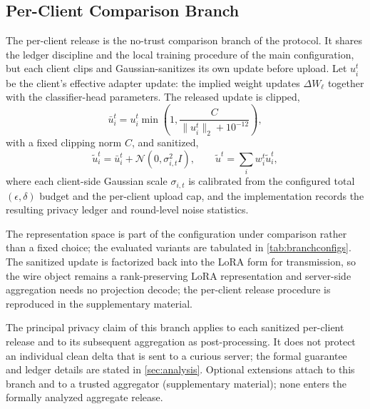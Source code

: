 \documentclass[a4paper,fleqn]{cas-dc}
\begin{document}
\subsection{Per-Client Comparison Branch}
\label{subsec:perclient}
\par
The per-client release is the no-trust comparison branch of the protocol. It shares the ledger discipline and the local training procedure of the main configuration, but each client clips and Gaussian-sanitizes its own update before upload. Let $u_i^t$ be the client's effective adapter update: the implied weight updates $\Delta W_\ell$ together with the classifier-head parameters. The released update is clipped,
\begin{equation}
\bar u_i^t=u_i^t\min\left(1,\frac{C}{\|u_i^t\|_2+10^{-12}}\right),
\end{equation}
with a fixed clipping norm $C$, and sanitized,
\begin{equation}
\widetilde u_i^t=\bar u_i^t+\mathcal{N}(0,\sigma_{i,t}^2 I),\qquad
\widetilde u^t=\sum_i w_i^t\widetilde u_i^t,
\end{equation}
where each client-side Gaussian scale $\sigma_{i,t}$ is calibrated from the configured total $(\epsilon,\delta)$ budget and the per-client upload cap, and the implementation records the resulting privacy ledger and round-level noise statistics.
\par
The representation space is part of the configuration under comparison rather than a fixed choice; the evaluated variants are tabulated in \cref{tab:branchconfigs}. The sanitized update is factorized back into the LoRA form for transmission, so the wire object remains a rank-preserving LoRA representation and server-side aggregation needs no projection decode; the per-client release procedure is reproduced in the supplementary material.
\par
The principal privacy claim of this branch applies to each sanitized per-client release and to its subsequent aggregation as post-processing. It does not protect an individual clean delta that is sent to a curious server; the formal guarantee and ledger details are stated in \cref{sec:analysis}. Optional extensions attach to this branch and to a trusted aggregator (supplementary material); none enters the formally analyzed aggregate release.
\par
\end{document}
